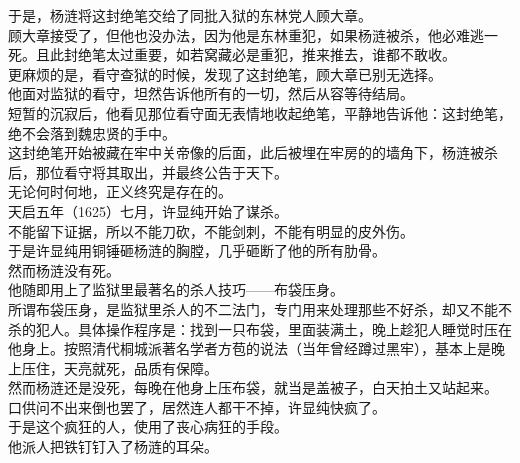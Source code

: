 \begin{multicols}{\theparacolNo}
于是，杨涟将这封绝笔交给了同批入狱的东林党人顾大章。\\

顾大章接受了，但他也没办法，因为他是东林重犯，如果杨涟被杀，他必难逃一死。且此封绝笔太过重要，如若窝藏必是重犯，推来推去，谁都不敢收。\\

更麻烦的是，看守查狱的时候，发现了这封绝笔，顾大章已别无选择。\\

他面对监狱的看守，坦然告诉他所有的一切，然后从容等待结局。\\

短暂的沉寂后，他看见那位看守面无表情地收起绝笔，平静地告诉他：这封绝笔，绝不会落到魏忠贤的手中。\\

这封绝笔开始被藏在牢中关帝像的后面，此后被埋在牢房的的墙角下，杨涟被杀后，那位看守将其取出，并最终公告于天下。\\

无论何时何地，正义终究是存在的。\\

天启五年（1625）七月，许显纯开始了谋杀。\\

不能留下证据，所以不能刀砍，不能剑刺，不能有明显的皮外伤。\\

于是许显纯用铜锤砸杨涟的胸膛，几乎砸断了他的所有肋骨。\\

然而杨涟没有死。\\

他随即用上了监狱里最著名的杀人技巧——布袋压身。\\

所谓布袋压身，是监狱里杀人的不二法门，专门用来处理那些不好杀，却又不能不杀的犯人。具体操作程序是：找到一只布袋，里面装满土，晚上趁犯人睡觉时压在他身上。按照清代桐城派著名学者方苞的说法（当年曾经蹲过黑牢），基本上是晚上压住，天亮就死，品质有保障。\\

然而杨涟还是没死，每晚在他身上压布袋，就当是盖被子，白天拍土又站起来。\\

口供问不出来倒也罢了，居然连人都干不掉，许显纯快疯了。\\

于是这个疯狂的人，使用了丧心病狂的手段。\\

他派人把铁钉钉入了杨涟的耳朵。\\


\end{multicols}
